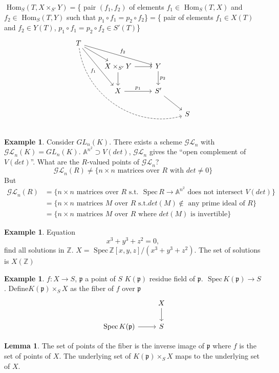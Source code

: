 \documentclass[11pt]{article}
\theoremstyle{definition}
\newtheorem{lemma}[thm]{Lemma}
\newtheorem{ex}[thm]{Example}
\renewcommand{\hom}{\text{ Hom}}
\newcommand{\spec}{\text{ Spec}\,}
\newcommand{\affn}{\mathbb A}
\newcommand{\intg}{\mathbb Z}
\newcommand{\scp}{{\mathfrak p}}
\newcommand{\lrta}{\longrightarrow}
\begin{document}
$\hom_S(T,X\times_{S'}Y)=$\{ pair $(f_1,f_2)$ of elements $f_1\in \hom_{S}(T,X)$ and $f_2\in \hom_S(T,Y)$  such that $p_1\circ f_1=p_2\circ f_2$\}$=$\{ pair of elements $f_1\in X(T)$ and $f_2\in Y(T)$, $p_1\circ f_1=p_2\circ f_2\in S'(T)$\}
$$
\begin{tikzcd}
T \arrow[rd] \arrow[rdd, "f_1"'] \arrow[rrd, "f_2"] \arrow[rrrddd, dashed, bend right=49] &  &  &  \\
 & X\times_{S'}Y \arrow[d] \arrow[r] & Y \arrow[d, "p_2"] &  \\
 & X \arrow[r, "p_1"] & S' \arrow[rd] &  \\
 &  &  & S
\end{tikzcd}
$$
\begin{ex}Consider
$GL_n(K)$. There exists a scheme $\mathcal{GL}_n$ with $\mathcal{GL}_n(K)=GL_n(K)$.
$\affn^{n^2}\supset V(det)$, $\mathcal{GL}_n$ gives the ``open complement of $V(det)$''. What are the $R$-valued points of $\mathcal{GL}_n$?
$$
\mathcal{GL}_n(R)\neq \{n\times n\text{ matrices over $R$ with } det \neq 0 \}
$$
But
$$
\begin{aligned}
\mathcal{GL}_n(R)&=\{n\times n\text{ matrices over $R$ s.t. }\spec R\lrta \affn^{n^2}\text{ does not intersect }V(det)\}\\
&=\{n\times n\text{ matrices $M$ over $R$ s.t.} det(M) \notin\text{ any prime ideal of }R \}\\
&=\{n\times n\text{ matrices $M$ over $R$ where } det(M)\text{ is invertible}\}
\end{aligned}
$$
\end{ex}

\begin{ex}
Equation
$$
x^3+y^3+z^2=0,
$$
find all solutions in $\intg$. 
$X=\spec \intg[x,y,z]/(x^3+y^3+z^2)$. The set of solutions is $X(\intg)$
\end{ex}

\begin{ex}
$f:X\lrta S$, $\scp$ a point of $S$
$K(\scp)$ residue field of $\scp$. $\spec K(\scp)\lrta S$. Define$K(\scp)\times_S X$ as the fiber of $f$ over $\scp$
$$
\begin{tikzcd}
 & X \arrow[d] \\
\spec K(\scp) \arrow[r] & S
\end{tikzcd}
$$
\end{ex}
\begin{lemma}
The set of points of the fiber is the inverse image of $\scp$ where $f$ is the set of points of $X$. The underlying set of $K(\scp)\times_SX$ maps to the underlying set of $X$.


\end{lemma}
\end{document}
